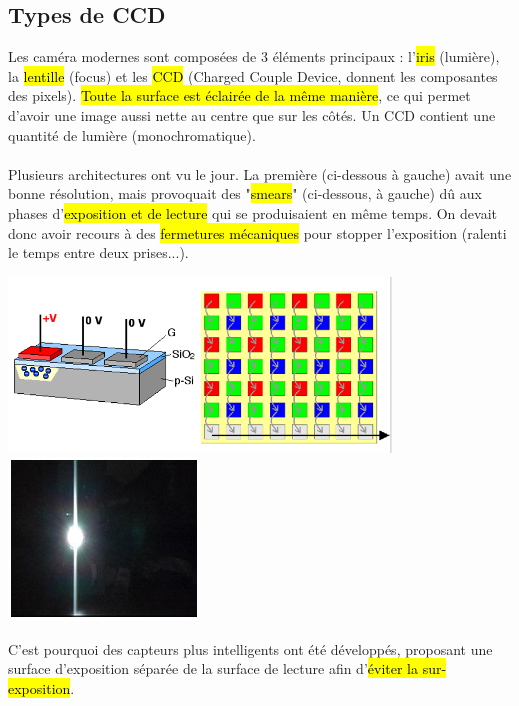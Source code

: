 \documentclass[letterpaper, 12pt]{article}
\newcommand{\alinea}{
\hspace*{0.5cm}}
\begin{document}
	\subsection{Types de CCD}
		\alinea Les caméra modernes sont composées de 3 éléments principaux : l'\hl{iris} (lumière), la \hl{lentille} (focus) et 
			les \hl{CCD} (Charged Couple Device, donnent les composantes des pixels). \hl{Toute la surface est éclairée de la même
			manière}, ce qui permet d'avoir une image aussi nette au centre que sur les côtés. Un CCD contient une quantité de 
			lumière (monochromatique).\\
		~\\
		\alinea Plusieurs architectures ont vu le jour. La première (ci-dessous à gauche) avait une bonne résolution, mais 
			provoquait des "\hl{smears}" (ci-dessous, à gauche) dû aux phases d'\hl{exposition et de lecture} qui se produisaient 
			en même temps. On devait donc avoir recours à des \hl{fermetures mécaniques} pour stopper l'exposition (ralenti le temps
			entre deux prises...).
		\begin{center}
			\includegraphics[width=4in]{Images/ccd1} \includegraphics[width=2in]{Images/smear}
		\end{center}
		\pagebreak
		\alinea C'est pourquoi des capteurs plus intelligents ont été développés, proposant une surface d'exposition séparée de la
			surface de lecture afin d'\hl{éviter la sur-exposition}.
\end{document}
